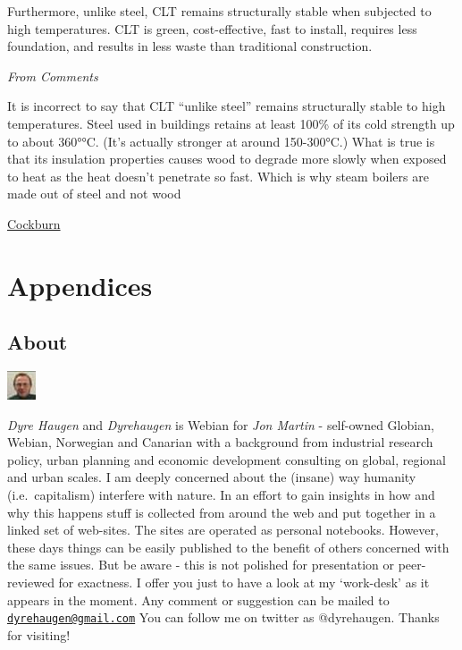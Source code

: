 \documentclass[
]{book}
\begin{document}
Furthermore, unlike steel, CLT remains structurally stable when subjected to high temperatures.
CLT is green, cost-effective, fast to install, requires less foundation, and results in less waste than traditional construction.

\emph{From Comments}

It is incorrect to say that CLT ``unlike steel'' remains structurally stable to high temperatures. Steel used in buildings retains at least 100\% of its cold strength up to about 360°°C. (It's actually stronger at around 150-300°C.) What is true is that its insulation properties causes wood to degrade more slowly when exposed to heat as the heat doesn't penetrate so fast. Which is why steam boilers are made out of steel and not wood

\href{https://www.independent.co.uk/climate-change/news/wood-construction-concrete-steel-climate-b1796342.html}{Cockburn}

\hypertarget{part-appendices}{%
\part{Appendices}\label{part-appendices}}

\hypertarget{appendix-appendices}{%
\appendix}


\hypertarget{about}{%
\chapter{About}\label{about}}

\includegraphics{fig/me.jpg}

\emph{Dyre Haugen} and \emph{Dyrehaugen} is Webian for \emph{Jon Martin} -
self-owned Globian, Webian, Norwegian and Canarian with
a background from industrial research policy, urban planning and
economic development consulting on global, regional and urban scales.
I am deeply concerned about the (insane) way
humanity (i.e.~capitalism) interfere with nature.
In an effort to gain insights in how and why this happens
stuff is collected from around the web and put together
in a linked set of web-sites.
The sites are operated as personal notebooks.
However, these days things can be easily published to the
benefit of others concerned with the same issues.
But be aware - this is not polished for presentation or
peer-reviewed for exactness.
I offer you just to have a look at my `work-desk' as it appears in the moment.
Any comment or suggestion can be mailed to \href{mailto:dyrehaugen@gmail.com}{\nolinkurl{dyrehaugen@gmail.com}}
You can follow me on twitter as @dyrehaugen.
Thanks for visiting!
\end{document}
